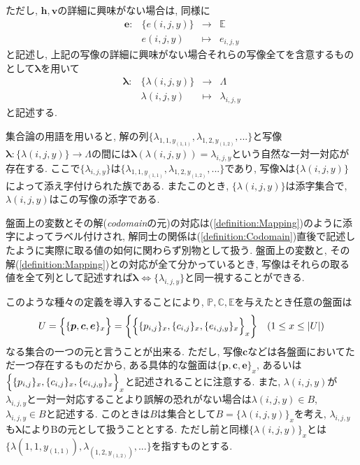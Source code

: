 \begin{definition}[写像$\bm{p}$, $\bm{c}$, $\bm{h}$, $\bm{v}$]
  ただし, $\bm{h},\bm{v}$の詳細に興味がない場合は, 同様に
  \begin{equation*}
    \begin{array}{rccc}
      \bm{e}\colon & \{e(i,j,y)\} & \longrightarrow & \mathbb{E} \\
                   & e(i,j,y)     & \longmapsto     & e_{i,j,y}
    \end{array}
  \end{equation*}
  と記述し, 上記の写像の詳細に興味がない場合それらの写像全てを含意するものとして$\bm{\lambda}$を用いて
  \begin{equation*}
    \begin{array}{rccc}
      \bm{\lambda}\colon & \{\lambda(i,j,y)\} & \longrightarrow & \Lambda         \\
                         & \lambda(i,j,y)     & \longmapsto     & \lambda_{i,j,y}
    \end{array}
  \end{equation*}
  と記述する.
\end{definition}
集合論の用語を用いると, 解の列$\{\lambda_{1,1,y_{(1,1)}}, \lambda_{1,2,y_{(1,2)}},...\}$と写像$\bm{\lambda}\colon \{\lambda(i,j,y)\} \longrightarrow \Lambda$の間には$\bm{\lambda}(\lambda(i,j,y))=\lambda_{i,j,y}$という自然な一対一対応が存在する.
ここで$\{\lambda_{i,j,y}\}$は$\{\lambda_{1,1,y_{(1,1)}}, \lambda_{1,2,y_{(1,2)}},...\}$であり, 写像$\bm{\lambda}$は$\{\lambda(i,j,y)\}$によって添え字付けられた族である. またこのとき, $\{\lambda(i,j,y)\}$は添字集合で, $\lambda(i,j,y)$はこの写像の添字である.

盤面上の変数とその解(\textit{codomain}の元)の対応は(\cref{definition:Mapping})のように添字によってラベル付けされ, 解同士の関係は(\cref{definition:Codomain})直後で記述したように実際に取る値の如何に関わらず別物として扱う.
盤面上の変数と, その解(\cref{definition:Mapping})との対応が全て分かっているとき, 写像はそれらの取る値を全て列として記述すれば$\bm{\lambda}\Leftrightarrow \{\lambda_{i,j,y}\}$と同一視することができる.

このような種々の定義を導入することにより, $\mathbb{P},\mathbb{C},\mathbb{E}$を与えたとき任意の盤面は
\begin{equation}\label{equation:U}
  U=\Bigl\{\{\bm{p},\bm{c},\bm{e}\}_x\Bigr\}=\biggl\{\Bigl\{\{p_{i,j}\}_x,\{c_{i,j}\}_x,\{e_{i,j,y}\}_x\Bigr\}_x\biggr\} \quad (1\leq x \leq |U|)
\end{equation}
なる集合の一つの元と言うことが出来る.
ただし, 写像$\bm{c}$などは各盤面においてただ一つ存在するものだから, ある具体的な盤面は$\{\bm{p},\bm{c},\bm{e}\}_x$, あるいは$\Bigl\{\{p_{i,j}\}_x,\{c_{i,j}\}_x,\{e_{i,j,y}\}_x\Bigr\}_x$と記述されることに注意する.
また, $\lambda(i,j,y)$が$\lambda_{i,j,y}$と一対一対応することより誤解の恐れがない場合は$\lambda(i,j,y) \in B  $,  $\lambda_{i,j,y}\in B $と記述する.
このときは$B$は集合として$B=\{\lambda(i,j,y)\}_x$を考え, $\lambda_{i,j,y}$も$\bm{\lambda}$によりBの元として扱うこととする.
ただし前と同様$\{\lambda(i,j,y)\}_x$とは$\{\lambda(1,1,y_{(1,1)}), \lambda_(1,2,y_{(1,2)}),...\}$を指すものとする.

